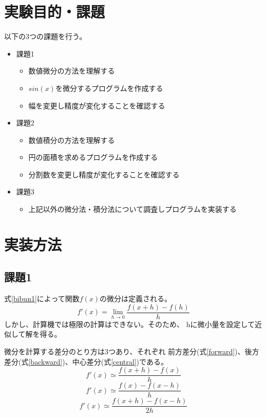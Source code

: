\documentclass[dvipdfmx]{jsarticle}
\begin{document}
\section{実験目的・課題}
以下の3つの課題を行う。
\begin{itemize}
  \item 課題1
        \begin{itemize}
          \item 数値微分の方法を理解する
          \item $sin(x)$を微分するプログラムを作成する
          \item 幅を変更し精度が変化することを確認する
        \end{itemize}
  \item 課題2
        \begin{itemize}
          \item 数値積分の方法を理解する
          \item 円の面積を求めるプログラムを作成する
          \item 分割数を変更し精度が変化することを確認する
        \end{itemize}
  \item 課題3
        \begin{itemize}
          \item 上記以外の微分法・積分法について調査しプログラムを実装する
        \end{itemize}
\end{itemize}

\section{実装方法}

\subsection{課題1}

式\ref{bibun1}によって関数$f(x)$の微分は定義される。
\begin{equation}
  f'(x) = \lim_{h \to 0} \frac{f(x+h)-f(h)}{h}
  \label{bibun1}
\end{equation}
しかし、計算機では極限の計算はできない。そのため、
hに微小量を設定して近似して解を得る。

微分を計算する差分のとり方は3つあり、それぞれ
前方差分(式\ref{forward})、後方差分(式\ref{backward})、中心差分(式\ref{central})である。
\begin{equation}
  f'(x) \simeq \frac{f(x+h)-f(x)}{h}
  \label{forward}
\end{equation}
\begin{equation}
  f'(x) \simeq \frac{f(x)-f(x-h)}{h}
  \label{backward}
\end{equation}
\begin{equation}
  f'(x) \simeq \frac{f(x+h)-f(x-h)}{2h}
  \label{central}
\end{equation}
\end{document}
